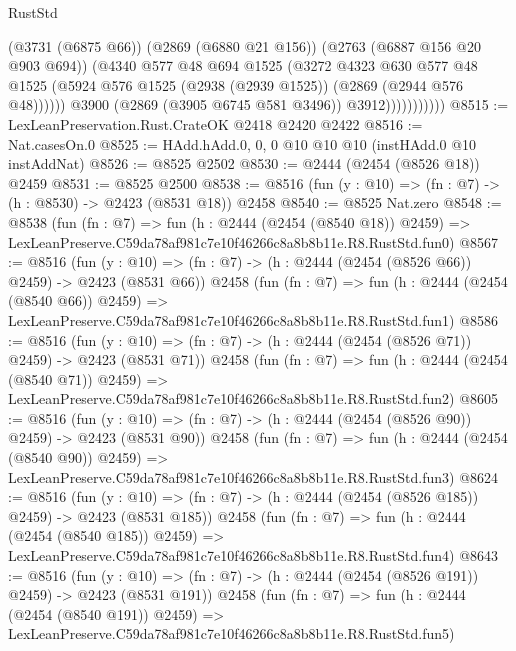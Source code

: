 \begin{lexlean}{RustStd}
\begin{coremodule}
                            (@3731 (@6875 @66))
                            (@2869 (@6880 @21 @156))
                            (@2763 (@6887 @156 @20 @903 @694))
                            (@4340
                              @577
                              @48
                              @694
                              @1525
                              (@3272
                                @4323
                                @630
                                @577
                                @48
                                @1525
                                (@5924 @576 @1525 (@2938 (@2939 @1525)) (@2869 (@2944 @576 @48))))))
                          @3900
                          (@2869 (@3905 @6745 @581 @3496))
                          @3912)))))))))))
@8515 := LexLeanPreservation.Rust.CrateOK @2418 @2420 @2422
@8516 := Nat.casesOn.{0}
@8525 := HAdd.hAdd.{0, 0, 0} @10 @10 @10 (instHAdd.{0} @10 instAddNat)
@8526 := @8525 @2502
@8530 := @2444 (@2454 (@8526 @18)) @2459
@8531 := @8525 @2500
@8538 := @8516 (fun (y : @10) => (fn : @7) -> (h : @8530) -> @2423 (@8531 @18)) @2458
@8540 := @8525 Nat.zero
@8548 := @8538
    (fun (fn : @7) =>
    fun (h : @2444 (@2454 (@8540 @18)) @2459) =>
    LexLeanPreserve.C59da78af981c7e10f46266c8a8b8b11e.R8.RustStd.fun0)
@8567 := @8516
    (fun (y : @10) => (fn : @7) -> (h : @2444 (@2454 (@8526 @66)) @2459) -> @2423 (@8531 @66))
    @2458
    (fun (fn : @7) =>
    fun (h : @2444 (@2454 (@8540 @66)) @2459) =>
    LexLeanPreserve.C59da78af981c7e10f46266c8a8b8b11e.R8.RustStd.fun1)
@8586 := @8516
    (fun (y : @10) => (fn : @7) -> (h : @2444 (@2454 (@8526 @71)) @2459) -> @2423 (@8531 @71))
    @2458
    (fun (fn : @7) =>
    fun (h : @2444 (@2454 (@8540 @71)) @2459) =>
    LexLeanPreserve.C59da78af981c7e10f46266c8a8b8b11e.R8.RustStd.fun2)
@8605 := @8516
    (fun (y : @10) => (fn : @7) -> (h : @2444 (@2454 (@8526 @90)) @2459) -> @2423 (@8531 @90))
    @2458
    (fun (fn : @7) =>
    fun (h : @2444 (@2454 (@8540 @90)) @2459) =>
    LexLeanPreserve.C59da78af981c7e10f46266c8a8b8b11e.R8.RustStd.fun3)
@8624 := @8516
    (fun (y : @10) => (fn : @7) -> (h : @2444 (@2454 (@8526 @185)) @2459) -> @2423 (@8531 @185))
    @2458
    (fun (fn : @7) =>
    fun (h : @2444 (@2454 (@8540 @185)) @2459) =>
    LexLeanPreserve.C59da78af981c7e10f46266c8a8b8b11e.R8.RustStd.fun4)
@8643 := @8516
    (fun (y : @10) => (fn : @7) -> (h : @2444 (@2454 (@8526 @191)) @2459) -> @2423 (@8531 @191))
    @2458
    (fun (fn : @7) =>
    fun (h : @2444 (@2454 (@8540 @191)) @2459) =>
    LexLeanPreserve.C59da78af981c7e10f46266c8a8b8b11e.R8.RustStd.fun5)

\end{coremodule}
\end{lexlean}
